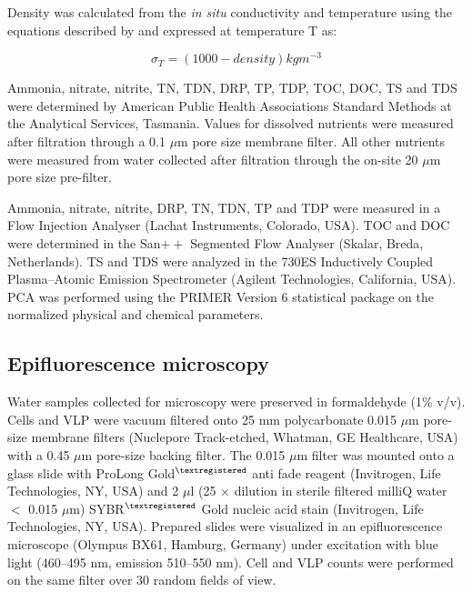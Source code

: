 Density was calculated from the \emph{in situ} conductivity and temperature using the equations described by \citet{Gibson1990} and expressed at temperature T as:

\begin{equation}
\sigma_T = (1000 - density) kg m^{-3}
\label{eqn:density}
\end{equation}

Ammonia, nitrate, nitrite, \ac{TN}, \ac{TDN}, \ac{DRP}, \ac{TP}, \ac{TDP}, \ac{TOC}, \ac{DOC}, \ac{TS} and \ac{TDS} were determined by American Public Health Associations Standard Methods at the Analytical Services, Tasmania. 
Values for dissolved nutrients were measured after filtration through a 0.1 $\mu$m pore size membrane filter. 
All other nutrients were measured from water collected after filtration through the on-site 20 $\mu$m pore size pre-filter.
 
Ammonia, nitrate, nitrite, \ac{DRP}, \ac{TN}, \ac{TDN}, \ac{TP} and \ac{TDP} were measured in a Flow Injection Analyser (Lachat Instruments, Colorado, USA). 
\ac{TOC} and \ac{DOC} were determined in the San$++$ Segmented Flow Analyser (Skalar, Breda, Netherlands). 
\ac{TS} and \ac{TDS} were analyzed in the 730ES Inductively Coupled Plasma--Atomic Emission Spectrometer (Agilent Technologies, California, USA). 
\ac{PCA} was performed using the PRIMER Version 6 statistical package \cite{Clarke2006} on the normalized physical and chemical parameters.

\subsection{Epifluorescence microscopy}
Water samples collected for microscopy were preserved in formaldehyde (1\% v/v). 
Cells and \acs{VLP} were vacuum filtered onto 25 mm polycarbonate 0.015 $\mu$m pore-size membrane filters (Nuclepore Track-etched, Whatman, GE Healthcare, USA) with a 0.45 $\mu$m pore-size backing filter. 
The 0.015 $\mu$m filter was mounted onto a glass slide with ProLong Gold$^{\textregistered}$ anti fade reagent (Invitrogen, Life Technologies, NY, USA) and 2 $\mu$l (25 × dilution in sterile filtered milliQ water $<$ 0.015 $\mu$m) SYBR$^{\textregistered}$ Gold nucleic acid stain (Invitrogen, Life Technologies, NY, USA). 
Prepared slides were visualized in an epifluorescence microscope (Olympus BX61, Hamburg, Germany) under excitation with blue light (460--495 nm, emission 510--550 nm). 
Cell and \ac{VLP} counts were performed on the same filter over 30 random fields of view.

